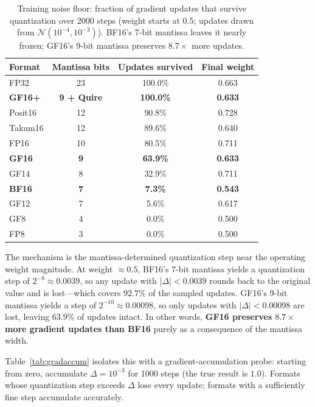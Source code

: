 \documentclass[11pt]{article}
\begin{document}
\begin{table}[h]
\centering
\small
\caption{Training noise floor: fraction of gradient updates that survive
quantization over 2000 steps (weight starts at $0.5$; updates drawn from
$\mathcal{N}(10^{-4},10^{-3})$). BF16's 7-bit mantissa leaves it nearly frozen;
GF16's 9-bit mantissa preserves $8.7\times$ more updates.}
\label{tab:noisefloor}
\begin{tabular}{lccc}
\toprule
Format & Mantissa bits & Updates survived & Final weight \\
\midrule
FP32       & 23 & 100.0\% & 0.663 \\
\textbf{GF16+} & \textbf{9 + Quire} & \textbf{100.0\%} & \textbf{0.633} \\
Posit16    & 12 & 90.8\%  & 0.728 \\
Takum16    & 12 & 89.6\%  & 0.640 \\
FP16       & 10 & 80.5\%  & 0.711 \\
\textbf{GF16}  & \textbf{9}  & \textbf{63.9\%}  & \textbf{0.633} \\
GF14       & 8  & 32.9\%  & 0.711 \\
\textbf{BF16}  & \textbf{7}  & \textbf{7.3\%}   & \textbf{0.543} \\
GF12       & 7  & 5.6\%   & 0.617 \\
GF8        & 4  & 0.0\%   & 0.500 \\
FP8        & 3  & 0.0\%   & 0.500 \\
\bottomrule
\end{tabular}
\end{table}

The mechanism is the mantissa-determined quantization step near the operating
weight magnitude. At weight $\approx 0.5$, BF16's 7-bit mantissa yields a
quantization step of $2^{-8} \approx 0.0039$, so any update with
$|\Delta| < 0.0039$ rounds back to the original value and is lost---which covers
$92.7\%$ of the sampled updates. GF16's 9-bit mantissa yields a step of
$2^{-10} \approx 0.00098$, so only updates with $|\Delta| < 0.00098$ are lost,
leaving $63.9\%$ of updates intact. In other words, \textbf{GF16 preserves
$8.7\times$ more gradient updates than BF16} purely as a consequence of the
mantissa width.

Table~\ref{tab:gradaccum} isolates this with a gradient-accumulation probe:
starting from zero, accumulate $\Delta = 10^{-3}$ for 1000 steps (the true
result is $1.0$). Formats whose quantization step exceeds $\Delta$ lose every
update; formats with a sufficiently fine step accumulate accurately.
\end{document}
